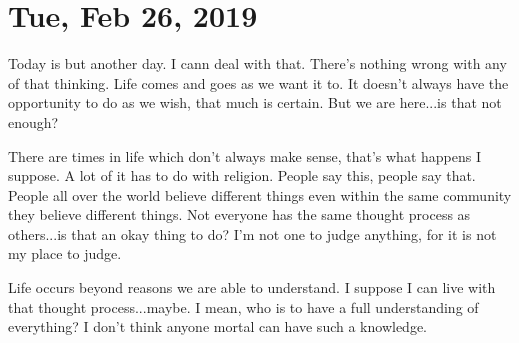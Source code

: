 \section{Tue, Feb 26, 2019}

Today is but another day. I cann deal with that. There's nothing
wrong with any of that thinking. Life comes and goes as we want
it to. It doesn't always have the opportunity to do as we wish,
that much is certain. But we are here...is that not enough?

There are times in life which don't always make sense, that's what
happens I suppose. A lot of it has to do with religion. People say this,
people say that. People all over the world believe different things even
within the same community they believe different things. Not everyone has
the same thought process as others...is that an okay thing to do? I'm
not one to judge anything, for it is not my place to judge.

Life occurs beyond reasons we are able to understand. I suppose I can
live with that thought process...maybe. I mean, who is to have a full
understanding of everything? I don't think anyone mortal can have such
a knowledge.

